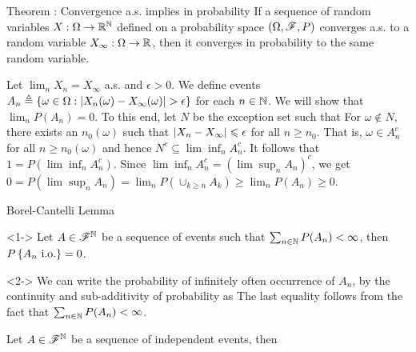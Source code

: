 \documentclass[12pt,aspectratio=169]{beamer}
\begin{document}
\begin{frame}

\begin{block}{Theorem : Convergence a.s. implies in probability} 
If a sequence of random variables $X: \Omega \to \mathbb{R}^{\mathbb{N}}$ defined on a probability space $(\Omega, \mathscr{F}, P)$ converges a.s. to a random variable $X_\infty:\Omega\to\mathbb{R}$, then it converges in probability to the same random variable.  
\end{block}
\end{frame}
\begin{frame}
\begin{Proof}  
Let $\lim_nX_n = X_\infty$ a.s. and $\epsilon > 0$. 
We define events $A_n \triangleq \left\{\omega \in \Omega: \left\lvert X_n(\omega)-X_\infty(\omega)\right\rvert > \epsilon\right\}$ for each $n \in \mathbb{N}$. 
We will show that %
$\lim_nP(A_n) = 0$. 
To this end, let $N$ be the exception set such that 
For $\omega \notin N$, there exists an $n_0(\omega)$ such that $\left\lvert X_n-X_\infty\right\rvert \leqslant  \epsilon$ for all $n \ge n_0$. 
That is, $\omega \in A_n^c$ for all $n \ge n_0(\omega)$ and hence $N^c \subseteq \lim\inf_nA_n^c$. 
It follows that $1 = P(\lim\inf_nA_n^c)$.   
Since  $\lim\inf_nA_n^c = (\lim\sup_nA_n)^c$, we get 
$0 = P(\lim\sup_nA_n) = \lim_nP(\cup_{k \ge n}A_k) \ge \lim_nP(A_n) \ge 0.$
\end{Proof}
\end{frame}

\begin{frame}{Borel-Cantelli Lemma}
\begin{prop}<1-> 
Let $A \in \mathscr{F}^{\mathbb{N}}$ be a sequence of events such that $\sum_{n \in \mathbb{N}}P(A_n) < \infty$, 
then $P\left\{A_n \text{ i.o.}\right\} = 0$. 
\end{prop}
\begin{Proof}<2->
We can write the probability of infinitely often occurrence of $A_n$, by the continuity and sub-additivity of probability as  
The last equality follows from the fact that $\sum_{n \in \mathbb{N}}P(A_n) < \infty$. 
\end{Proof}
\end{frame}
\begin{frame}
\begin{prop}
Let $A \in \mathscr{F}^{\mathbb{N}}$ be a sequence of independent events, then
\end{prop}
\end{frame}
\end{document}
